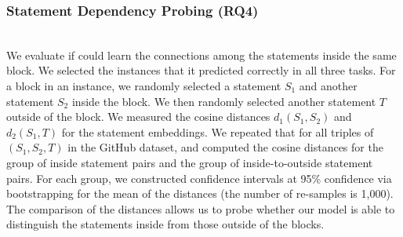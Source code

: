\vspace{2pt}
\subsubsection{Statement Dependency Probing (RQ4)}~\\
We evaluate if {\tool} could learn the connections
among the statements inside the same  block. We
selected the instances that it predicted correctly in all three
tasks. For a  block in an instance, we randomly
selected a statement $S_1$ and another statement $S_2$ inside the
block. We then randomly selected another statement $T$ outside of the
block. We measured the cosine distances $d_1(S_1,S_2)$ and $d_2(S_1,T)$
for the statement embeddings. We repeated that for all triples
of $(S_1,S_2,T)$ in the GitHub dataset, and computed the cosine
distances for the group of inside statement pairs and the group of
inside-to-outside statement pairs. For each group, we constructed
confidence intervals at 95\% confidence via bootstrapping for the mean
of the distances (the number of re-samples is 1,000). The comparison
of the distances allows us to probe whether our model is able to
distinguish the statements inside from those outside of the  blocks.

